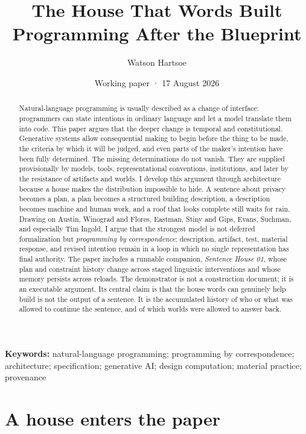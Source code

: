 \documentclass[11pt]{article}
\title{\bfseries The House That Words Built\\[0.35em]\large Programming After the Blueprint}
\author{Watson Hartsoe}
\date{Working paper · 17 August 2026}
\begin{document}
\maketitle

\begin{abstract}
Natural-language programming is usually described as a change of interface: programmers can state intentions in ordinary language and let a model translate them into code. This paper argues that the deeper change is temporal and constitutional. Generative systems allow consequential making to begin before the thing to be made, the criteria by which it will be judged, and even parts of the maker's intention have been fully determined. The missing determinations do not vanish. They are supplied provisionally by models, tools, representational conventions, institutions, and later by the resistance of artifacts and worlds. I develop this argument through architecture because a house makes the distribution impossible to hide. A sentence about privacy becomes a plan, a plan becomes a structured building description, a description becomes machine and human work, and a roof that looks complete still waits for rain. Drawing on Austin, Winograd and Flores, Eastman, Stiny and Gips, Evans, Suchman, and especially Tim Ingold, I argue that the strongest model is not deferred formalization but \emph{programming by correspondence}: description, artifact, test, material response, and revised intention remain in a loop in which no single representation has final authority. The paper includes a runnable companion, \emph{Sentence House 01}, whose plan and constraint history change across staged linguistic interventions and whose memory persists across reloads. The demonstrator is not a construction document; it is an executable argument. Its central claim is that the house words can genuinely help build is not the output of a sentence. It is the accumulated history of who or what was allowed to continue the sentence, and of which worlds were allowed to answer back.
\end{abstract}

\noindent\textbf{Keywords:} natural-language programming; programming by correspondence; architecture; specification; generative AI; design computation; material practice; provenance

\section{A house enters the paper}
\end{document}

